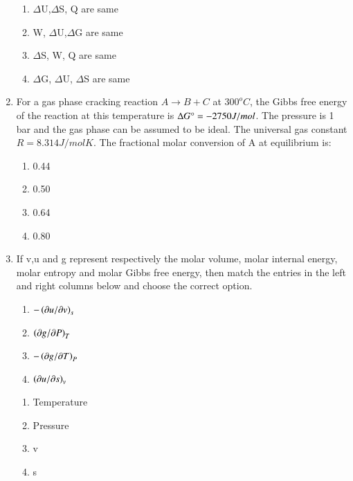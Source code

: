\documentclass[journal,12pt,onecolumn]{IEEEtran}
\theoremstyle{remark}
\begin{document}
\begin{enumerate}
\hfill{}
\begin{enumerate}
    \item $\Delta$U,$\Delta$S, Q are same
     \item W, $\Delta$U,$\Delta$G are same
      \item $\Delta$S, W, Q are same
       \item $\Delta$G, $\Delta$U, $\Delta$S are same
\end{enumerate}

    \item For a gas phase cracking reaction $A \to B+C$ at $300^{o}C$, the Gibbs free energy of the reaction at this temperature is $\Delta G\degree = -2750 J/mol$. The pressure is 1 bar and the gas phase can be assumed to be ideal. The universal gas constant $R = 8.314J/molK$. The fractional molar conversion of A at equilibrium is:

\hfill{}
\begin{enumerate}
    \item 0.44
     \item 0.50
      \item 0.64
       \item 0.80
\end{enumerate}

    \item If v,u and g represent respectively the molar volume, molar internal energy, molar entropy and molar Gibbs free energy, then match the entries in the left and right columns below and choose the correct option.

\hfill{}
\begin{multicols}{2}
    \begin{enumerate}[label =\Alph*]
        \item $-\left(\partial u/\partial v\right)_s$
         \item $\left(\partial g/\partial P\right)_T$
          \item $-\left(\partial g/\partial T\right)_P$
           \item $\left(\partial u/\partial s\right)_v$
    \end{enumerate}
\columnbreak
    \begin{enumerate}[label = \Roman*]
        \item Temperature
         \item Pressure
          \item v
           \item s
    \end{enumerate}
\end{multicols}


\end{enumerate}
\end{document}
